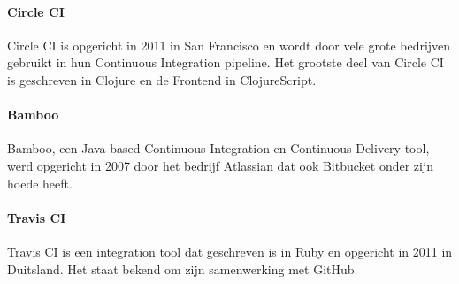             
            \paragraph{Circle CI}
            Circle CI is opgericht in 2011 in San Francisco en wordt door vele grote bedrijven gebruikt in hun Continuous Integration pipeline. Het grootste deel van Circle CI is geschreven in Clojure en de Frontend in ClojureScript. 

            \paragraph{Bamboo}
            Bamboo, een Java-based Continuous Integration en Continuous Delivery tool, werd opgericht in 2007 door het bedrijf Atlassian dat ook Bitbucket onder zijn hoede heeft.
            
            \paragraph{Travis CI}
            Travis CI is een integration tool dat geschreven is in Ruby en opgericht in 2011 in Duitsland. Het staat bekend om zijn samenwerking met GitHub.
            
